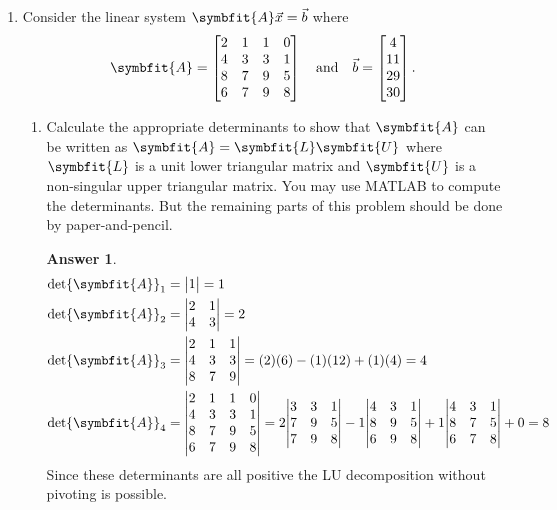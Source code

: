 \documentclass{article}
\theoremstyle{definition}
\newtheorem*{answer}{Answer}
\newcommand{\mat}[1]{\symbfit{#1}}
\begin{document}
\begin{enumerate}[leftmargin=\labelsep]
	\item Consider the linear system \(\mat{A}\vec{x} = \vec{b}\) where
	      \[
		      \mat{A} = \begin{bmatrix}
			      2 & 1 & 1 & 0 \\
			      4 & 3 & 3 & 1 \\
			      8 & 7 & 9 & 5 \\
			      6 & 7 & 9 & 8
		      \end{bmatrix}
		      \quad \text{and} \quad
		      \vec{b} = \begin{bmatrix}
			      4 \\ 11 \\ 29 \\ 30
		      \end{bmatrix}.
	      \]
	      \begin{enumerate}
		      \item Calculate the appropriate determinants to show that \(\mat{A}\) can be written as \(\mat{A} = \mat{L}\mat{U}\) where \(\mat{L}\) is a unit lower triangular matrix and \(\mat{U}\) is a non-singular upper triangular matrix. You may use MATLAB to compute the determinants. But the remaining parts of this problem should be done by paper-and-pencil.
		            \begin{answer}
			            \begin{align*}
				            \det\mat{A}_1 & = \mqty|1| = 1             \\
				            \det\mat{A}_2 & = \mqty|2      & 1         \\ 4 & 3| = 2 \\
				            \det\mat{A}_3 & = \mqty|2      & 1 & 1     \\ 4 & 3 & 3 \\ 8 & 7 & 9| = (2)(6)-(1)(12)+(1)(4) = 4 \\
				            \det\mat{A}_4 & = \mqty|2      & 1 & 1 & 0 \\ 4 & 3 & 3 & 1 \\ 8 & 7 & 9 & 5 \\ 6 & 7 & 9 & 8| = 2\mqty|3 & 3 & 1 \\ 7 & 9 & 5 \\ 7 & 9 & 8|-1\mqty|4 & 3 & 1 \\ 8 & 9 & 5 \\ 6 & 9 & 8| +1\mqty|4 & 3 & 1 \\ 8 & 7 & 5 \\ 6 & 7 & 8| + 0 = 8
			            \end{align*}
			            Since these determinants are all positive the LU decomposition without pivoting is possible.
		            \end{answer}


\end{enumerate}
\end{enumerate}
\end{document}
